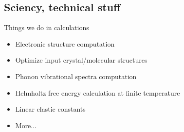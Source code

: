 \subsection{Sciency, technical stuff}

\begin{frame}{Things we do in \ab{} calculations}
    \begin{itemize}
        \item Electronic structure computation
        \item Optimize input crystal/molecular structures
        \item Phonon vibrational spectra computation
        \item Helmholtz free energy calculation at finite temperature
        \item Linear elastic constants
        \item More...
    \end{itemize}
\end{frame}
